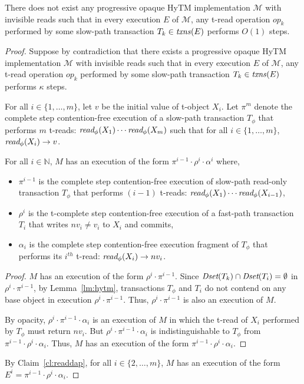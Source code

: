 \begin{theorem}
\label{th:impossibility}
There does not exist any progressive opaque HyTM implementation $\mathcal{M}$ with invisible reads such that in every execution $E$ of $\mathcal{M}$, any t-read operation $op_k$ performed by some slow-path transaction $T_k \in \ms{txns}(E)$
performs $O(1)$ steps.
\end{theorem}
%
\begin{proof}
Suppose by contradiction that there exists a progressive opaque HyTM implementation $\mathcal{M}$ with invisible reads such that in every execution $E$ of $\mathcal{M}$, any t-read operation $op_k$ performed by some slow-path transaction $T_k \in \ms{txns}(E)$
performs $\kappa$ steps.

For all $i\in \{1,\ldots , m\}$, let $v$ be the initial value of t-object $X_i$.
Let $\pi^{m}$ denote the complete step contention-free execution of a slow-path transaction
$T_{\phi}$ that performs ${m}$ t-reads: $\textit{read}_{\phi}(X_1)\cdots \textit{read}_{\phi}(X_{m})$
such that for all $i\in \{1,\ldots , m \}$, $\textit{read}_{\phi}(X_i) \rightarrow v$.
%
\begin{claim}
\label{cl:readdap}
For all $i\in \mathbb{N}$, $M$ has an execution of the form $\pi^{i-1}\cdot \rho^i\cdot \alpha^i$ where,
%
\begin{itemize}
\item
$\pi^{i-1}$ is the complete step contention-free execution of slow-path read-only transaction $T_{\phi}$ that performs
$(i-1)$ t-reads: $\textit{read}_{\phi}(X_1)\cdots \textit{read}_{\phi}(X_{i-1})$,
\item
$\rho^i$ is the t-complete step contention-free execution of a fast-path transaction $T_{i}$
that writes $nv_i\neq v_i$ to $X_i$ and commits,
\item
$\alpha_i$ is the complete step contention-free execution fragment of $T_{\phi}$ that performs its $i^{th}$ t-read:
$\textit{read}_{\phi}(X_i) \rightarrow nv_i$.
\end{itemize}
%
\end{claim}
%
\begin{proof}
%
$M$ has an execution of the form $\rho^i\cdot \pi^{i-1}$.
Since $\textit{Dset}(T_k) \cap \textit{Dset}(T_{i}) =\emptyset$ in $\rho^i\cdot \pi^{i-1}$,
by Lemma~\ref{lm:hytm}, transactions $T_{\phi}$ and $T_i$ do not contend
on any base object in execution $\rho^i\cdot \pi^{i-1}$.
Thus, $\rho^i\cdot \pi^{i-1}$ is also an execution of $M$.

By opacity, $\rho^i\cdot \pi^{i-1} \cdot \alpha_i$ is an execution
of $M$ in which the t-read of $X_i$ performed by $T_{\phi}$ must return $nv_i$.
But $\rho^i \cdot \pi^{i-1} \cdot \alpha_i$ is indistinguishable to $T_{\phi}$ from
$\pi^{i-1}\cdot \rho^i \cdot \alpha_i$.
Thus, $M$ has an execution of the form $\pi^{i-1}\cdot \rho^i \cdot \alpha_i$.
\end{proof}
%
By Claim~\ref{cl:readdap}, for all $i\in \{2,\ldots, m\}$, $M$ has an execution of the form 
$E^{i}=\pi^{i-1}\cdot \rho^i \cdot \alpha_i$.


\end{proof}
